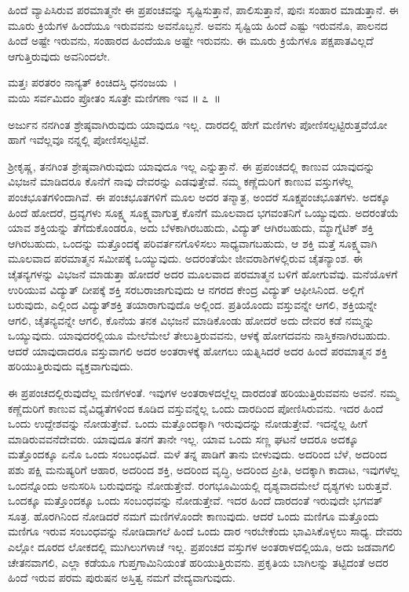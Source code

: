 ಹಿಂದೆ ವ್ಯಾಪಿಸಿರುವ ಪರಮಾತ್ಮನೇ ಈ ಪ್ರಪಂಚವನ್ನು ಸೃಷ್ಟಿಸುತ್ತಾನೆ, ಪಾಲಿಸುತ್ತಾನೆ, ಪುನಃ ಸಂಹಾರ ಮಾಡುತ್ತಾನೆ. ಈ ಮೂರು ಕ್ರಿಯೆಗಳ ಹಿಂದೆಯೂ ಇರುವವನು ಅವನೊಬ್ಬನೆ. ಅವನು ಸೃಷ್ಟಿಯ ಹಿಂದೆ ಎಷ್ಟು ಇರುವನೊ, ಪಾಲನದ ಹಿಂದೆ ಅಷ್ಟೇ ಇರುವನು, ಸಂಹಾರದ ಹಿಂದೆಯೂ ಅಷ್ಟೇ ಇರುವನು. ಈ ಮೂರು ಕ್ರಿಯೆಗಳೂ ಪಕ್ಷಪಾತವಿಲ್ಲದೆ ಆಗುತ್ತಿರುವುದು ಅವನಿಂದಲೇ.

\begin{shloka}
ಮತ್ತಃ ಪರತರಂ ನಾನ್ಯತ್ ಕಿಂಚಿದಸ್ತಿ ಧನಂಜಯ~।\\ಮಯಿ ಸರ್ವಮಿದಂ ಪ್ರೋತಂ ಸೂತ್ರೇ ಮಣಿಗಣಾ ಇವ \hfill॥ ೭~॥
\end{shloka}

\begin{artha}
ಅರ್ಜುನ ನನಗಿಂತ ಶ್ರೇಷ್ಠವಾಗಿರುವುದು ಯಾವುದೂ ಇಲ್ಲ. ದಾರದಲ್ಲಿ ಹೇಗೆ ಮಣಿಗಳು ಪೋಣಿಸಲ್ಪಟ್ಟಿರುತ್ತವೆಯೋ ಹಾಗೆ ಇವೆಲ್ಲವೂ ನನ್ನಲ್ಲಿ ಪೋಣಿಸಲ್ಪಟ್ಟಿವೆ.
\end{artha}

ಶ‍್ರೀಕೃಷ್ಣ, ತನಗಿಂತ ಶ್ರೇಷ್ಠವಾಗಿರುವುದು ಯಾವುದೂ ಇಲ್ಲ ಎನ್ನುತ್ತಾನೆ. ಈ ಪ್ರಪಂಚದಲ್ಲಿ ಕಾಣುವ ಯಾವುದನ್ನು ವಿಭಜನೆ ಮಾಡಿದರೂ ಕೊನೆಗೆ ನಾವು ದೇವರನ್ನು ಎಡವುತ್ತೇವೆ. ನಮ್ಮ ಕಣ್ಣೆದುರಿಗೆ ಕಾಣುವ ವಸ್ತುಗಳೆಲ್ಲ ಪಂಚಭೂತಗಳಿಂದಾಗಿವೆ. ಈ ಪಂಚಭೂತಗಳಿಗೆ ಮೂಲ ಅದರ ತನ್ಮಾತ್ರ, ಅಂದರೆ ಸೂಕ್ಷ್ಮಪಂಚಭೂತಗಳು. ಅದಕ್ಕೂ ಹಿಂದೆ ಹೋದರೆ, ದ್ರವ್ಯಗಳು ಸೂಕ್ಷ್ಮ ಸೂಕ್ಷ್ಮವಾಗುತ್ತ ಕೊನೆಗೆ ಮೂಲವಾದ ಭಗವಂತನಿಗೆ ಒಯ್ಯುವುದು. ಅದರಂತೆಯೆ ಯಾವ ಶಕ್ತಿಯನ್ನು ತೆಗೆದುಕೊಂಡರೂ, ಅದು ಬೆಳಕಾಗಿರಬಹುದು, ವಿದ್ಯುತ್ ಆಗಿರಬಹುದು, ಮ್ಯಾಗ್ನೆಟಿಕ್ ಶಕ್ತಿ ಆಗಿರಬಹುದು, ಒಂದನ್ನು ಮತ್ತೊಂದಕ್ಕೆ ಪರಿವರ್ತನಗೊಳಿಸಲು ಸಾಧ್ಯವಾಗಬಹುದು, ಆ ಶಕ್ತಿ ಮತ್ತೆ ಸೂಕ್ಷ್ಮವಾಗಿ ಮೂಲವಾದ ಪರಮಾತ್ಮನ ಸಮೀಪಕ್ಕೆ ಒಯ್ಯುವುದು. ಅದರಂತೆಯೇ ಜೀವರಾಶಿಗಳಲ್ಲಿರುವ ಚೈತನ್ಯಾಂಶ. ಈ ಚೈತನ್ಯಗಳನ್ನು ವಿಭಜನೆ ಮಾಡುತ್ತಾ ಹೋದರೆ ಅದರ ಮೂಲವಾದ ಪರಮಾತ್ಮನ ಬಳಿಗೆ ಹೋಗುವೆವು. ಮನೆಯೊಳಗೆ ಉರಿಯುವ ವಿದ್ಯುತ್ ದೀಪಕ್ಕೆ ಶಕ್ತಿ ಸರಬರಾಜಾಗುವುದು ಆ ನಗರದ ಕೇಂದ್ರ ವಿದ್ಯುತ್ ಆಫೀಸಿನಿಂದ. ಅಲ್ಲಿಗೆ ಬರುವುದು, ಎಲ್ಲಿಂದ ವಿದ್ಯುತ್​ಶಕ್ತಿ ತಯಾರಾಗುವುದೊ ಅಲ್ಲಿಂದ. ಪ್ರತಿಯೊಂದು ವಸ್ತುವನ್ನೇ ಆಗಲಿ, ಶಕ್ತಿಯನ್ನೇ ಆಗಲಿ, ಚೈತನ್ಯವನ್ನೇ ಆಗಲಿ, ಕೊನೆಯ ತನಕ ವಿಭಜನೆ ಮಾಡಿಕೊಂಡು ಹೋದರೆ ಅದು ದೇವರ ಕಡೆ ನಮ್ಮನ್ನು ಒಯ್ಯುವುದು. ಯಾವುದರಲ್ಲಿಯೂ ಮೇಲೆಮೇಲೆ ತೇಲುತ್ತಿರುವವನು, ಆಳಕ್ಕೆ ಹೋಗದವನು ನಾಸ್ತಿಕನಾಗಿರಬಹುದು. ಆದರೆ ಯಾವುದಾದರೂ ವಸ್ತುವಾಗಲಿ ಅದರ ಅಂತರಾಳಕ್ಕೆ ಹೋಗಲು ಯತ್ನಿಸಿದರೆ ಅದರ ಹಿಂದೆ ಪರಮಾತ್ಮನ ಶಕ್ತಿ ಹರಿಯುತ್ತಿರುವುದು ವ್ಯಕ್ತವಾಗುವುದು.

ಈ ಪ್ರಪಂಚದಲ್ಲಿರುವುದೆಲ್ಲ ಮಣಿಗಳಂತೆ. ಇವುಗಳ ಅಂತರಾಳದಲ್ಲೆಲ್ಲ ದಾರದಂತೆ ಹರಿಯು\-ತ್ತಿರುವವನು ಅವನೆ. ನಮ್ಮ ಕಣ್ಣೆದುರಿಗೆ ಕಾಣುವ ವೈವಿಧ್ಯತೆಗಳಿಂದ ಕೂಡಿದ ವಸ್ತುವನ್ನೆಲ್ಲ ಒಂದು ದಾರದಿಂದ ಪೋಣಿಸಿರುವನು. ಇದರ ಹಿಂದೆ ಒಂದು ಉದ್ದೇಶವನ್ನು ನೋಡುತ್ತೇವೆ. ಒಂದು ಮತ್ತೊಂದಕ್ಕಾಗಿ ಇರುವುದನ್ನು ನೋಡುತ್ತೇವೆ. ಇದನ್ನೆಲ್ಲ ಹೀಗೆ ಮಾಡಿರುವವನೆ\break ದೇವರು. ಯಾವುದೂ ತನಗೆ ತಾನೇ ಇಲ್ಲ. ಯಾವ ಒಂದು ಸಣ್ಣ ಘಟನೆ ಆದರೂ ಅದಕ್ಕೂ ಮತ್ತೊಂದಕ್ಕೂ ಏನೊ ಒಂದು ಸಂಬಂಧವಿದೆ. ಮಳೆ ತನ್ನ ಪಾಡಿಗೆ ತಾನು ಬೀಳುವುದು. ಅದರಿಂದ ಬೆಳೆ, ಅದರಿಂದ ಪಶು ಪಕ್ಷಿ ಮನುಷ್ಯರಿಗೆ ಆಹಾರ, ಅದರಿಂದ ಶಕ್ತಿ, ಅದರಿಂದ ವೃದ್ಧಿ, ಅದರಿಂದ ಪ್ರೀತಿ, ಅದಕ್ಕಾಗಿ ಕಾದಾಟ, ಇವುಗಳೆಲ್ಲ ಒಂದನ್ನೊಂದು ಅನುಸರಿಸಿ ಬರುವುದನ್ನು ನೋಡುತ್ತೇವೆ. ರಂಗಭೂಮಿಯಲ್ಲಿ ದೃಶ್ಯವಾದಮೇಲೆ ದೃಶ್ಯಗಳು ಬರುತ್ತವೆ. ಒಂದಕ್ಕೂ ಮತ್ತೊಂದಕ್ಕೂ ಒಂದು ಸಂಬಂಧವನ್ನು ನೋಡುತ್ತೇವೆ. ಇದರ ಹಿಂದೆ ದಾರದಂತೆ ಇರುವುದೇ ಭಗವತ್ ಸೂತ್ರ. ಹೊರಗಿನಿಂದ ನೋಡಿದರೆ ನಮಗೆ ಮಣಿಗಳೊಂದೇ ಕಾಣುವುದು. ಆದರೆ ಒಂದು ಮಣಿಗೂ ಮತ್ತೊಂದು ಮಣಿಗೂ ಇರುವ ಸಂಬಂಧವನ್ನು ನೋಡಿದಾಗಲೆ ಹಿಂದೆ ಒಂದು ದಾರ ಇರಬೇಕೆಂದು ಭಾವಿಸಿಕೊಳ್ಳಲು ಸಾಧ್ಯ. ದೇವರು ಎಲ್ಲೋ ದೂರದ ಲೋಕದಲ್ಲಿ ಮುಗಿಲುಗಳಾಚೆ ಇಲ್ಲ. ಪ್ರಪಂಚದ ವಸ್ತುಗಳ ಅಂತರಾಳದಲ್ಲಿಯೂ, ಅದು ಜಡವಾಗಲಿ ಚೇತನವಾಗಲಿ, ಎಲ್ಲಾ ಕಡೆಯೂ ಗುಪ್ತಗಾಮಿನಿಯಂತೆ ಹರಿಯುತ್ತಿರುವನು. ಪ್ರಕೃತಿಯ ಬಾಗಿಲನ್ನು ತಟ್ಟಿದಂತೆ ಅದರ ಹಿಂದೆ ಇರುವ ಪರಮ ಪುರುಷನ ಅಸ್ತಿತ್ವ ನಮಗೆ ವೇದ್ಯವಾಗುವುದು.

